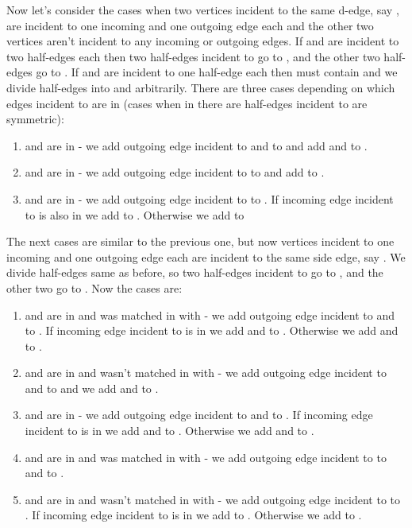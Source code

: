 \documentclass[a4, 11pt]{article}
\newcommand{\<}{\langle}
\renewcommand{\>}{\rangle}
\begin{document}
Now let's consider the cases when two vertices incident to the same d-edge, say , are incident to one incoming and one outgoing edge each and the other two vertices aren't incident to any incoming or outgoing edges. If  and  are incident to two half-edges each then two half-edges incident to  go to , and the other two half-edges go to . If  and  are incident to one half-edge each then  must contain  and we divide half-edges into  and  arbitrarily. There are three cases depending on which edges incident to  are in  (cases when in  there are half-edges incident to  are symmetric):
\begin{enumerate}
	\item  and  are in  - we add outgoing edge incident to  and  to  and add  and  to .
	\item  and  are in  - we add outgoing edge incident to  to  and add  to .
	\item  and  are in  - we add outgoing edge incident to  to . If incoming edge incident to  is also in  we add  to . Otherwise we add  to 
\end{enumerate}

The next cases are similar to the previous one, but now vertices incident to one incoming and one outgoing edge each are incident to the same side edge, say . We divide half-edges same as before, so two half-edges incident to  go to , and the other two go to . Now the cases are:
\begin{enumerate}
	\item  and  are in  and  was matched in  with  - we add outgoing edge incident to  and  to . If incoming edge incident to  is in  we add  and  to . Otherwise we add  and  to .
	\item  and  are in  and  wasn't matched in  with  - we add outgoing edge incident to  and  to  and we add  and  to .
	\item  and  are in  - we add outgoing edge incident to  and  to . If incoming edge incident to  is in  we add  and  to . Otherwise we add  and  to .
	\item  and  are in  and  was matched in  with  - we add outgoing edge incident to  to  and  to .
	\item  and  are in  and  wasn't matched in  with  - we add outgoing edge incident to  to . If incoming edge incident to  is in  we add  to . Otherwise we add  to .
\end{enumerate}
\end{document}
